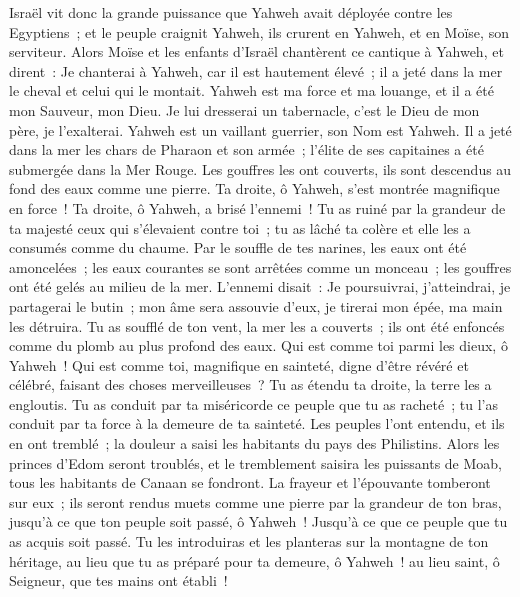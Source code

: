 \begin{multicols}{2}
Israël vit donc la grande puissance que Yahweh avait déployée contre les Egyptiens~; et le peuple craignit Yahweh, ils crurent en Yahweh, et en Moïse, son serviteur.
\VerseOne{}Alors Moïse et les enfants d'Israël chantèrent ce cantique à Yahweh, et dirent~: Je chanterai à Yahweh, car il est hautement élevé~; il a jeté dans la mer le cheval et celui qui le montait.
Yahweh est ma force et ma louange, et il a été mon Sauveur, mon Dieu. Je lui dresserai un tabernacle, c'est le Dieu de mon père, je l'exalterai.
Yahweh est un vaillant guerrier, son Nom est Yahweh.
Il a jeté dans la mer les chars de Pharaon et son armée~; l'élite de ses capitaines a été submergée dans la Mer Rouge.
Les gouffres les ont couverts, ils sont descendus au fond des eaux comme une pierre.
Ta droite, ô Yahweh, s'est montrée magnifique en force~! Ta droite, ô Yahweh, a brisé l'ennemi~!
Tu as ruiné par la grandeur de ta majesté ceux qui s'élevaient contre toi~; tu as lâché ta colère et elle les a consumés comme du chaume.
Par le souffle de tes narines, les eaux ont été amoncelées~; les eaux courantes se sont arrêtées comme un monceau~; les gouffres ont été gelés au milieu de la mer.
L'ennemi disait~: Je poursuivrai, j'atteindrai, je partagerai le butin~; mon âme sera assouvie d'eux, je tirerai mon épée, ma main les détruira.
Tu as soufflé de ton vent, la mer les a couverts~; ils ont été enfoncés comme du plomb au plus profond des eaux.
Qui est comme toi parmi les dieux, ô Yahweh~! Qui est comme toi, magnifique en sainteté, digne d'être révéré et célébré, faisant des choses merveilleuses~?
Tu as étendu ta droite, la terre les a engloutis.
Tu as conduit par ta miséricorde ce peuple que tu as racheté~; tu l'as conduit par ta force à la demeure de ta sainteté.
Les peuples l'ont entendu, et ils en ont tremblé~; la douleur a saisi les habitants du pays des Philistins.
Alors les princes d'Edom seront troublés, et le tremblement saisira les puissants de Moab, tous les habitants de Canaan se fondront.
La frayeur et l'épouvante tomberont sur eux~; ils seront rendus muets comme une pierre par la grandeur de ton bras, jusqu'à ce que ton peuple soit passé, ô Yahweh~! Jusqu'à ce que ce peuple que tu as acquis soit passé.
Tu les introduiras et les planteras sur la montagne de ton héritage, au lieu que tu as préparé pour ta demeure, ô Yahweh~! au lieu saint, ô Seigneur, que tes mains ont établi~!

\end{multicols}
